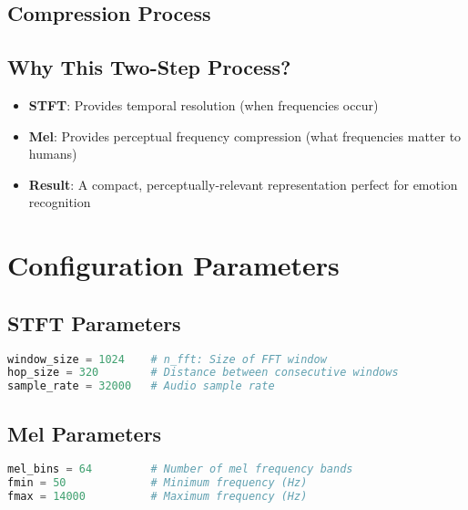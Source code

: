 \documentclass[12pt]{article}
\begin{document}
\subsection{Compression Process}
\begin{center}
\end{center}

\subsection{Why This Two-Step Process?}
\begin{itemize}
    \item \textbf{STFT}: Provides temporal resolution (when frequencies occur)
    \item \textbf{Mel}: Provides perceptual frequency compression (what frequencies matter to humans)
    \item \textbf{Result}: A compact, perceptually-relevant representation perfect for emotion recognition
\end{itemize}

\section{Configuration Parameters}

\subsection{STFT Parameters}
\begin{lstlisting}[language=Python, basicstyle=\small]
window_size = 1024    # n_fft: Size of FFT window
hop_size = 320        # Distance between consecutive windows
sample_rate = 32000   # Audio sample rate
\end{lstlisting}

\subsection{Mel Parameters}
\begin{lstlisting}[language=Python, basicstyle=\small]
mel_bins = 64         # Number of mel frequency bands
fmin = 50             # Minimum frequency (Hz)
fmax = 14000          # Maximum frequency (Hz)
\end{lstlisting}
\end{document}
